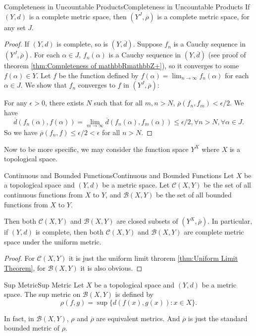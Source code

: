 \documentclass[../main.tex]{subfiles}
\begin{document}
\begin{theorem}{Completeness in Uncountable Products}{Completeness in Uncountable Products}
	If $(Y,d)$ is a complete metric space, then $(Y^J, \overline{\rho})$ is a complete metric space, for any set $J$.
\end{theorem}
\begin{proof}
	If $(Y,d)$ is complete, so is $(Y,\overline{d})$. Suppose $f_n$ is a Cauchy sequence in $(Y^J, \overline{\rho})$. For each $\alpha \in J$, $f_n(\alpha)$ is a Cauchy sequence in $(Y,\overline{d})$ (see proof of theorem \ref{thm:Completeness of mathbbRmathbbZ+}), so it converges to some $f(\alpha) \in Y$. Let $f$ be the function defined by $f(\alpha) = \lim_{n \to \infty} f_n(\alpha)$ for each $\alpha \in J$. We show that $f_n$ converges to $f$ in $(Y^J, \overline{\rho})$:

	For any $\epsilon > 0$, there exists $N$ such that for all $m,n > N$, $\overline{\rho}(f_n, f_m) < \epsilon / 2$. We have
	\begin{equation*}
		\overline{d}(f_n(\alpha), f(\alpha)) = \lim_{m \to \infty} \overline{d}(f_n(\alpha), f_m(\alpha)) \leq \epsilon / 2, \forall n > N, \forall \alpha \in J.
	\end{equation*}
	So we have $\overline{\rho}(f_n, f) \leq \epsilon / 2 < \epsilon$ for all $n > N$.
\end{proof}

Now to be more specific, we may consider the function space $Y^X$ where $X$ is a topological space.

\begin{theorem}{Continuous and Bounded Functions}{Continuous and Bounded Functions}
	Let $X$ be a topological space and $(Y,d)$ be a metric space. Let $\mathscr{C}(X,Y)$ be the set of all continuous functions from $X$ to $Y$, and $\mathscr{B}(X,Y)$ be the set of all bounded functions from $X$ to $Y$.

	Then both $\mathscr{C}(X,Y)$ and $\mathscr{B}(X,Y)$ are closed subsets of $(Y^X, \overline{\rho})$. In particular, if $(Y,d)$ is complete, then both $\mathscr{C}(X,Y)$ and $\mathscr{B}(X,Y)$ are complete metric space under the uniform metric.
\end{theorem}
\begin{proof}
	For $\mathscr{C}(X,Y)$ it is just the uniform limit throrem \ref{thm:Uniform Limit Theorem}, for $\mathscr{B}(X,Y)$ it is also obvious.
\end{proof}

\begin{definition}{Sup Metric}{Sup Metric}
	Let $X$ be a topological space and $(Y,d)$ be a metric space. The sup metric on $\mathscr{B}(X,Y)$ is defined by
	\begin{equation}
		\rho(f,g) = \sup \{d(f(x), g(x)) : x \in X \}.
	\end{equation}
\end{definition}
In fact, in $\mathscr{B}(X,Y)$, $\rho$ and $\overline{\rho}$ are equivalent metrics. And $\overline{\rho}$ is just the standard bounded metric of $\rho$.
\end{document}
